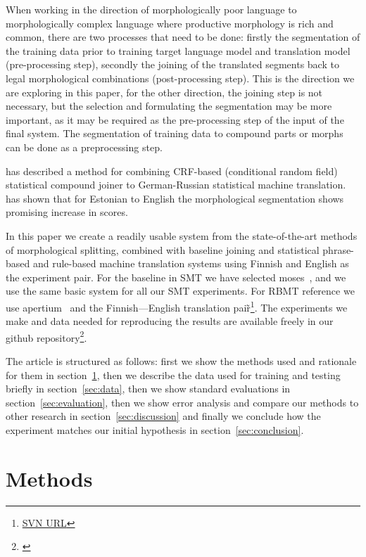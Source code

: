 \documentclass[color]{pbml}
\begin{document}
When working in the
direction of morphologically poor language to morphologically complex language
where productive morphology is rich and common, there are two processes that
need to be done: firstly the segmentation of the training data prior to
training target language model and translation model (pre-processing step),
secondly the joining of the translated segments back to legal morphological
combinations (post-processing step). This is the direction we are exploring in
this paper, for the other direction, the joining step is not necessary, but the
selection and formulating the segmentation may be more important, as it may be
required as the pre-processing step of the input of the final system.  The
segmentation of training data to compound parts or morphs can be done as a
preprocessing step.

\citet{cap2014produce} has described a method for combining
CRF-based (conditional random field) statistical compound joiner to
German-Russian statistical machine translation.
\citet{fishel2010linguistically} has shown that for Estonian to English the
morphological segmentation shows promising increase in scores.

In this paper we create a readily usable system from the state-of-the-art
methods of morphological splitting, combined with baseline joining and
statistical phrase-based and rule-based machine translation systems using
Finnish and English as the experiment pair. For the baseline in SMT we have
selected moses~\citep{}, and we use the same basic system for all our SMT
experiments.  For RBMT reference we use apertium~\citep{forcada2011apertium}
and the Finnish---English translation pair̃\footnote{\url{SVN URL}}.  The
experiments we make and data needed for reproducing the results are available
freely in our github repository\footnote{\url{}}.

The article is structured as follows: first we show the methods used and 
rationale for them in section~\ref{sec:methods}, then we describe the data used
for training and testing briefly in section~\ref{sec:data}, then we show
standard evaluations in section~\ref{sec:evaluation}, then we show error
analysis and compare our methods to other research in section~\ref{sec:discussion} and finally we conclude how the experiment matches our initial hypothesis in
section~\ref{sec:conclusion}.

\section{Methods}
\label{sec:methods}
\end{document}
